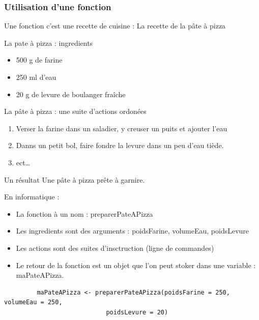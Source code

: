 \documentclass[table,svgnames,hyperref={pdfpagemode=FullScreen}]{beamer}
\begin{document}
\begin{frame}
	\frametitle{Utilisation d'une fonction}
	Une fonction c'est une recette de cuisine : La recette de la pâte à pizza
	\begin{exampleblock}{La pate à pizza  : ingredients}
		\begin{itemize}
			\item 500 g de farine
			\item 250 ml d'eau
			\item 20 g de levure de boulanger fraîche
		\end{itemize}
	\end{exampleblock}
\end{frame}
\begin{frame}
	\begin{exampleblock}{La pâte à pizza :  une suite d'actions ordonées}
		\begin{enumerate}
			\item Verser la farine dans un saladier, y creuser un puits et ajouter l'eau
			\item Danns un petit bol, faire fondre la levure dans un peu d'eau tiède.
			\item ect\dots
		\end{enumerate}
			
	\end{exampleblock}
\end{frame}
\begin{frame}
	\begin{exampleblock}{Un résultat}
		Une pâte à pizza prête à garnire.
	\end{exampleblock}
\end{frame}
\begin{frame}[fragile]
	\begin{exampleblock}{En informatique : }
		\begin{itemize}
			\item La fonction à un nom  : preparerPateAPizza
			\item Les ingredients sont des arguments : poidsFarine, volumeEau, poidsLevure
			\item Les actions sont des suites d'insctruction (ligne de commandes)
			\item Le retour de la fonction est un objet que l'on peut stoker dans une variable : maPateAPizza.
		\end{itemize}
		\begin{lstlisting}
		 maPateAPizza <- preparerPateAPizza(poidsFarine = 250, volumeEau = 250, 
							poidsLevure = 20) 
		 \end{lstlisting}
	\end{exampleblock}
	
\end{frame}
\end{document}

